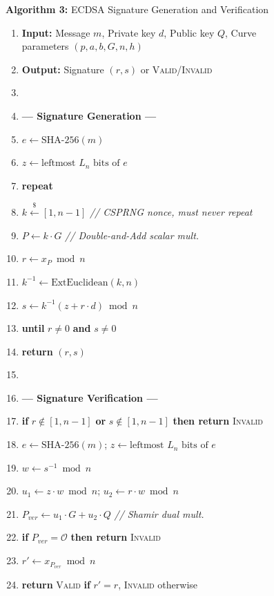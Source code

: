 \documentclass[journal, 10pt, twocolumn]{IEEEtran}
\begin{document}
\begin{figure}[!t]
\hrulefill
\vspace{-0.2cm}
\begin{center}
\textbf{Algorithm 3:} ECDSA Signature Generation and Verification
\end{center}
\vspace{-0.2cm}
\hrulefill
\begin{enumerate}
    \item \textbf{Input:} Message $m$, Private key $d$, Public key $Q$, Curve parameters $(p, a, b, G, n, h)$
    \item \textbf{Output:} Signature $(r, s)$ or \textsc{Valid}/\textsc{Invalid}
    \item[]
    \item[] \textbf{--- Signature Generation ---}
    \item $e \leftarrow \text{SHA-256}(m)$
    \item $z \leftarrow \text{leftmost } L_n \text{ bits of } e$
    \item \textbf{repeat}
    \item \quad $k \xleftarrow{\$} [1, n-1]$ \quad \textit{// CSPRNG nonce, must never repeat}
    \item \quad $P \leftarrow k \cdot G$ \quad \textit{// Double-and-Add scalar mult.}
    \item \quad $r \leftarrow x_P \bmod n$
    \item \quad $k^{-1} \leftarrow \text{ExtEuclidean}(k, n)$
    \item \quad $s \leftarrow k^{-1}(z + r \cdot d) \bmod n$
    \item \textbf{until} $r \neq 0$ \textbf{and} $s \neq 0$
    \item \textbf{return} $(r, s)$
    \item[]
    \item[] \textbf{--- Signature Verification ---}
    \item \textbf{if} $r \notin [1, n-1]$ \textbf{or} $s \notin [1, n-1]$ \textbf{then return} \textsc{Invalid}
    \item $e \leftarrow \text{SHA-256}(m)$; \quad $z \leftarrow \text{leftmost } L_n \text{ bits of } e$
    \item $w \leftarrow s^{-1} \bmod n$
    \item $u_1 \leftarrow z \cdot w \bmod n$; \quad $u_2 \leftarrow r \cdot w \bmod n$
    \item $P_{ver} \leftarrow u_1 \cdot G + u_2 \cdot Q$ \quad \textit{// Shamir dual mult.}
    \item \textbf{if} $P_{ver} = \mathcal{O}$ \textbf{then return} \textsc{Invalid}
    \item $r' \leftarrow x_{P_{ver}} \bmod n$
    \item \textbf{return} \textsc{Valid} \textbf{if} $r' = r$, \textsc{Invalid} otherwise
\end{enumerate}
\hrulefill
\end{figure}
\end{document}
